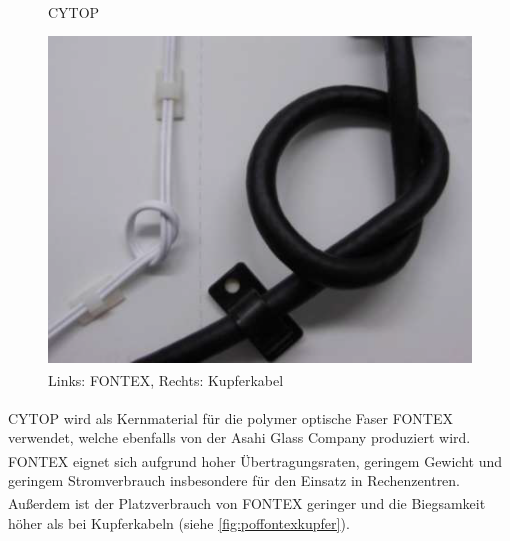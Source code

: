 \begin{figure}[H]
    \begin{center}
        \begin{minipage}{0.4\textwidth}
            \begin{center}
                \footnotesize


                \caption{CYTOP\textsuperscript{\texttrademark}}
                \label{rec:cytop}
            \end{center}
        \end{minipage}
        \hspace{0.025\textwidth}
        \begin{minipage}{0.4\textwidth}
            \begin{center}
                \includegraphics[height=0.1275\textheight]{Bilder/Optische_Wellenleiter_Die_Polymer_Optische_Faser/Cytop/poffontexkupfer.png}
                \caption[Links: FONTEX\textsuperscript{\texttrademark}, Rechts: Kupferkabel\newline              \url{www.lucina.jp/eg_fontex/pdf/Tecnhical.pdf} S.10 (zuletzt aufgerufen am 19.09.2015)]{Links: FONTEX\textsuperscript{\texttrademark}, Rechts: Kupferkabel}
                \label{fig:poffontexkupfer}
            \end{center}
        \end{minipage}
    \end{center}
\end{figure}

CYTOP\textsuperscript{\texttrademark} wird als Kernmaterial für die polymer
optische Faser FONTEX\textsuperscript{\texttrademark} verwendet, welche
ebenfalls von der Asahi Glass Company produziert wird.
FONTEX\textsuperscript{\texttrademark} eignet sich aufgrund hoher
Übertragungsraten, geringem Gewicht und geringem Stromverbrauch insbesondere für
den Einsatz in Rechenzentren. Außerdem ist der Platzverbrauch von
FONTEX\textsuperscript{\texttrademark} geringer und die Biegsamkeit höher als
bei Kupferkabeln (siehe \autoref{fig:poffontexkupfer}). \cite{poffontex}
